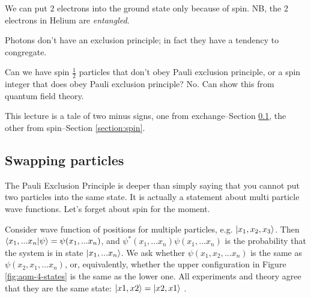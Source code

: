 \documentclass[]{article}
\begin{document}
We can put 2 electrons into the ground state only because of spin. NB, the 2 electrons in Helium are \textit{entangled}.

Photons don't have an exclusion principle; in fact they have a tendency to congregate.
 
Can we have spin $\frac{1}{2}$ particles that don't obey Pauli exclusion principle, or a spin integer that does obey Pauli exclusion principle? No. Can show this from quantum field theory.

This lecture is a tale of two minus signs, one from exchange--Section \ref{section:swap},  the other from spin--Section \ref{section:spin}.

\subsection{Swapping particles}\label{section:swap}

The Pauli Exclusion Principle is deeper than simply saying that you cannot put two particles into the same state. It is actually a statement about multi particle wave functions. Let's forget about spin for the moment.

Consider wave function of positions for multiple particles, e.g. $\ket{x_1,x_2,x_3}$. Then $\braket{x_1,...x_n|\psi}=\psi(x_1,...x_n)$, and $\psi^*(x_1,...x_n)\psi(x_1,...x_n)$ is the probability that the system is in state $\ket{x_1,...x_n}$. We ask whether $\psi(x_1,x_2,...x_n)$ is the same as $\psi(x_2,x_1,...x_n)$, or, equivalently, whether the upper configuration in Figure \ref{fig:aqm-4-states} is the same as the lower one. All experiments and theory agree that they are the same state: $\ket{x1,x2}=\ket{x2,x1}$ .
\end{document}

